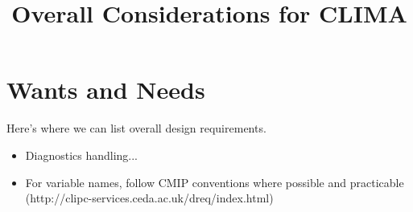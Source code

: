 \documentclass{article}
\title{Overall Considerations for CLIMA}
\begin{document}
\maketitle

\section{Wants and Needs}

Here's where we can list overall design requirements.
\begin{itemize}
    \item Diagnostics handling...
    \item For variable names, follow CMIP conventions where possible and practicable (http://clipc-services.ceda.ac.uk/dreq/index.html)
\end{itemize}
\end{document}
